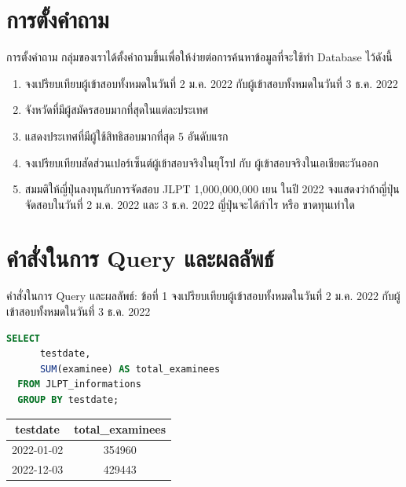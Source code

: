 \documentclass{beamer}
\begin{document}
\section{การตั้งคำถาม}

\begin{frame}{การตั้งคำถาม}
  กลุ่มของเราได้ตั้งคำถามขึ้นเพื่อให้ง่ายต่อการค้นหาข้อมูลที่จะใช้ทำ Database ไว้ดังนี้
  \begin{enumerate}
    \item จงเปรียบเทียบผู้เข้าสอบทั้งหมดในวันที่ 2 ม.ค. 2022 กับผู้เข้าสอบทั้งหมดในวันที่ 3 ธ.ค. 2022 
    \item จังหวัดที่มีผู้สมัครสอบมากที่สุดในแต่ละประเทศ 
    \item แสดงประเทศที่มีผู้ใช้สิทธิสอบมากที่สุด 5 อันดับแรก
    \item จงเปรียบเทียบสัดส่วนเปอร์เซ็นต์ผู้เข้าสอบจริงในยุโรป กับ ผู้เข้าสอบจริงในเอเชียตะวันออก
    \item สมมติให้ญี่ปุ่นลงทุนกับการจัดสอบ JLPT 1,000,000,000 เยน ในปี 2022 จงแสดงว่าถ้าญี่ปุ่นจัดสอบในวันที่ 2 ม.ค. 2022 และ 3 ธ.ค. 2022 ญี่ปุ่นจะได้กำไร หรือ ขาดทุนเท่าใด
\end{enumerate}
\end{frame}

\section{คำสั่งในการ Query และผลลัพธ์}

\begin{frame}[fragile]{คำสั่งในการ Query และผลลัพธ์: ข้อที่ 1}
  จงเปรียบเทียบผู้เข้าสอบทั้งหมดในวันที่ 2 ม.ค. 2022 กับผู้เข้าสอบทั้งหมดในวันที่ 3 ธ.ค. 2022
  \begin{lstlisting}[language=SQL]
  SELECT 
      testdate,
      SUM(examinee) AS total_examinees
  FROM JLPT_informations
  GROUP BY testdate;
  \end{lstlisting}
  \begin{table}[ht]
    \centering
    \begin{tabular}{|c|c|}
      \hline
      \textbf{testdate} & \textbf{total\_examinees} \\
      \hline
      2022-01-02 & 354960 \\
      2022-12-03 & 429443 \\
      \hline
    \end{tabular}
  \end{table}
\end{frame}
\end{document}
